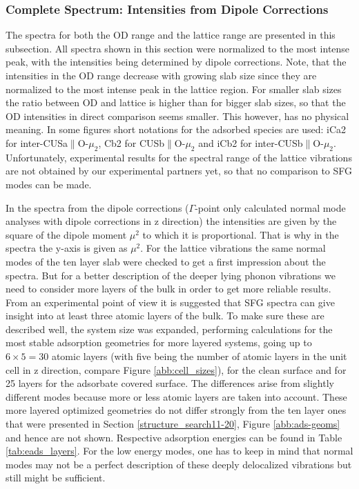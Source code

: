 \documentclass[11pt,DIV=13,BCOR=5mm,a4paper,headinclude]{scrbook}
\newcommand\todo[1]{\textcolor{red}{TODO: \textit{{#1}}}}
\begin{document}
\subsubsection{Complete Spectrum: Intensities from Dipole Corrections}\label{phonons}

The spectra for both the OD range and the lattice range are presented in this subsection.
All spectra shown in this section were normalized to the most intense peak, with the intensities being determined by dipole corrections.
Note, that the intensities in the OD range decrease with growing slab size since they are normalized to the most intense peak in the lattice region.
For smaller slab sizes the ratio between OD and lattice is higher than for bigger slab sizes, so that the OD intensities in direct comparison seems smaller.
This however, has no physical meaning.
In some figures short notations for the adsorbed species are used: iCa2 for inter-CUSa$\parallel$O-$\mu_2$, Cb2 for CUSb$\parallel$O-$\mu_2$ and iCb2 for inter-CUSb$\parallel$O-$\mu_2$.
Unfortunately, experimental results for the spectral range of the lattice vibrations are not obtained by our experimental partners yet, so that no comparison to SFG modes can be made.


In the spectra from the dipole corrections ($\Gamma$-point only calculated normal mode analyses with dipole corrections in z direction) the intensities are given by the square of the dipole moment $\mu^2$ to which it is proportional.
That is why in the spectra the y-axis is given as $\mu^2$.
For the lattice vibrations the same normal modes of the ten layer slab were checked to get a first impression about the spectra.
But for a better description of the deeper lying phonon vibrations we need to consider more layers of the bulk in order to get more reliable results.
From an experimental point of view it is suggested that SFG spectra can give insight into at least three atomic layers of the bulk.
To make sure these are described well, the system size was expanded, performing calculations for the most stable adsorption geometries for more layered systems, going up to $6\times 5=30$ atomic layers (with five being the number of atomic layers in the unit cell in z direction, compare Figure \ref{abb:cell_sizes}), for the clean surface and for 25 layers for the adsorbate covered surface.
The differences arise from slightly different modes because more or less atomic layers are taken into account.
These more layered optimized geometries do not differ strongly from the ten layer ones that were presented in Section \ref{structure_search11-20}, Figure \ref{abb:ads-geoms} and hence are not shown.
Respective adsorption energies can be found in Table \ref{tab:eads_layers}.
For the low energy modes, one has to keep in mind that normal modes may not be a perfect description of these deeply delocalized vibrations but still might be sufficient.
\end{document}
